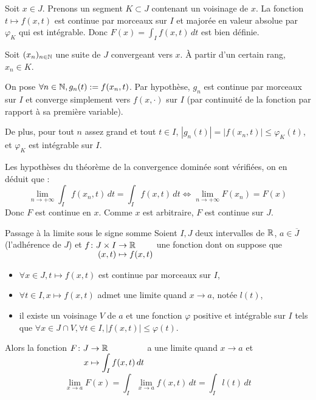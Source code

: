 \documentclass[a4paper, 12pt]{article}
\begin{document}
\begin{demonstration}
    Soit $x \in J$. Prenons un segment $K \subset J$ contenant un voisinage de $x$.
    La fonction $t \mapsto f(x, t)$ est continue par morceaux sur $I$ et majorée en valeur absolue par $\varphi_K$ qui est intégrable.
    Donc $F(x) = \int_I f(x, t) \, dt$ est bien définie.

    Soit $(x_n)_{n \in \mathbb{N}}$ une suite de $J$ convergeant vers $x$. À partir d'un certain rang, $x_n \in K$.
    
    On pose $\forall n \in \mathbb{N}, g_n(t) := f(x_n, t)$.
    Par hypothèse, $g_n$ est continue par morceaux sur $I$ et converge simplement vers $f(x, \cdot)$ sur $I$ (par continuité de la fonction par rapport à sa première variable).

    De plus, pour tout $n$ assez grand et tout $t \in I$, $|g_n(t)| = |f(x_n, t)| \leq \varphi_K(t)$, et $\varphi_K$ est intégrable sur $I$.

    Les hypothèses du théorème de la convergence dominée sont vérifiées, on en déduit que :
    $$
    \lim_{n \to +\infty} \int_I f(x_n, t) \, dt = \int_I f(x, t) \, dt \iff \lim_{n \to +\infty} F(x_n) = F(x)
    $$
    Donc $F$ est continue en $x$. Comme $x$ est arbitraire, $F$ est continue sur $J$.
\end{demonstration}

\begin{theoreme}{Passage à la limite sous le signe somme}{}
    Soient $I, J$ deux intervalles de $\mathbb{R}$, $a \in \overline{J}$ (l'adhérence de $J$) et $\funcdef{f}{J \times I}{\R}{(x, t)}{f(x, t)}$ une fonction dont on suppose que
    \begin{itemize}
        \item $\forall x \in J, t \mapsto f(x, t)$ est continue par morceaux sur $I$,
        \item $\forall t \in I, x \mapsto f(x, t)$ admet une limite quand $x \to a$, notée $l(t)$,
        \item il existe un voisinage $V$ de $a$ et une fonction $\varphi$ positive et intégrable sur $I$ tels que $\forall x \in J \cap V, \forall t \in I, |f(x, t)| \leq \varphi(t)$.
    \end{itemize}
    Alors la fonction $\funcdef{F}{J}{\R}{x}{\int_I f(x, t) \, dt}$ a une limite quand $x \to a$ et
    $$
    \lim_{x \to a} F(x) = \int_I \lim_{x \to a} f(x, t) \, dt = \int_I l(t) \, dt
    $$
\end{theoreme}
\end{document}
